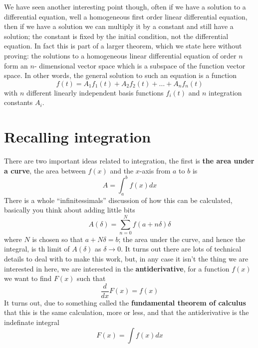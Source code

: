 \documentclass[12pt]{article}
\begin{document}
We have seen another interesting point though, often if we have a
solution to a differential equation, well a homogeneous first order
linear differential equation, then if we have a solution we can
multiply it by a constant and still have a solution; the constant is
fixed by the initial condition, not the differential equation. In fact
this is part of a larger theorem, which we state here without proving: the solutions to a homogeneous linear differential equation of order $n$ form an $n$-
dimensional vector space which is a subspace of the function vector space. In other words, the
general solution to such an equation is a function
\begin{equation}
  f(t)=A_1f_1(t)+A_2f_2(t)+\ldots+A_nf_n(t)
\end{equation}
 with $n$ different linearly
independent basis functions $f_i(t)$ and $n$ integration constants $A_i$.





\section*{Recalling integration}

There are two important ideas related to integration, the first is
\textbf{the area under a curve}, the area between $f(x)$ and the
$x$-axis from $a$ to $b$ is
\begin{equation}
  A=\int_a^bf(x)dx
\end{equation}
There is a whole ``infinitessimals'' discussion of how this can be calculated, basically you think about adding little bits
\begin{equation}
  A(\delta)=\sum_{n=0}^Nf(a+n\delta)\delta
\end{equation}
where $N$ is chosen so that $a+N\delta=b$; the area under the curve, and hence the integral, is th limit of $A(\delta)$ as $\delta\rightarrow 0$. It turns out there are lots of technical details to deal with to make this work, but, in any case it isn't the thing we are interested in here, we are interested in the \textbf{antiderivative}, for a function $f(x)$ we want to find $F(x)$ such that
\begin{equation}
  \frac{d}{dx}F(x)=f(x)
\end{equation}
It turns out, due to something called the \textbf{fundamental theorem of calculus} that this is the same calculation, more or less, and that the antiderivative is the indefinate integral
\begin{equation}
  F(x)=\int f(x)dx
\end{equation}
\end{document}
